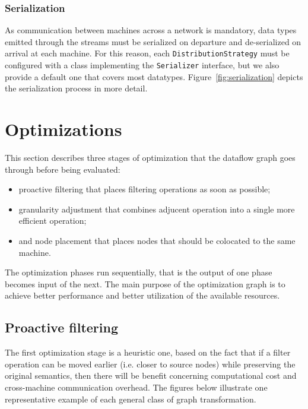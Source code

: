 \documentclass[sigplan,screen,review,anonymous]{acmart}
\begin{document}
\subsubsection{Serialization}
As communication between machines across a network is mandatory, data types
emitted through the streams must be serialized on departure and de-serialized on
arrival at each machine. For this reason, each \texttt{DistributionStrategy}
must be configured with a class implementing the \texttt{Serializer} interface,
but we also provide a default one that covers most datatypes.
Figure~\ref{fig:serialization} depicts the serialization process in more detail.


\section{Optimizations} \label{sec:optimization}

This section describes three stages of optimization that the dataflow graph goes
through before being evaluated:
\begin{itemize}
  \item proactive filtering that places filtering operations as soon as possible;
  \item granularity adjustment that combines adjucent operation into a single more efficient operation;
  \item and node placement that places nodes that should be colocated to the same machine.
\end{itemize}
The optimization phases run sequentially, that is the output of one phase becomes
input of the next. The main purpose of the optimization graph is to achieve better
performance and better utilization of the available resources.

\subsection{Proactive filtering}
The first optimization stage is a heuristic one, based on the fact that if a
filter operation can be moved earlier (i.e. closer to source nodes) while
preserving the original semantics, then there will be benefit concerning
computational cost and cross-machine communication overhead. The figures below
illustrate one representative example of each general class of
graph transformation.

\end{document}
